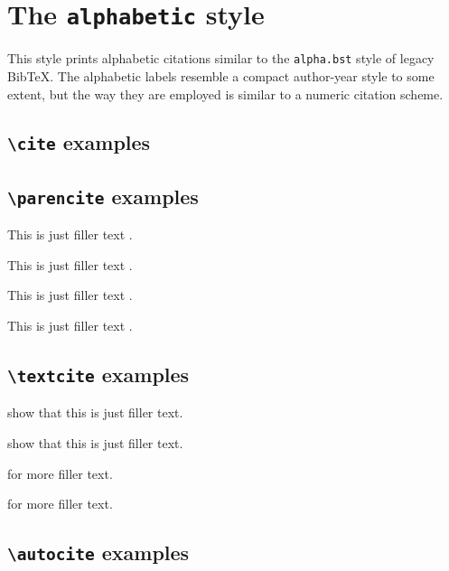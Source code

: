 \documentclass[a4paper]{article}
\newcommand{\cmd}[1]{\texttt{\textbackslash #1}}
\begin{document}
\section*{The \texttt{alphabetic} style}

This style prints alphabetic citations similar to the
\texttt{alpha.bst} style of legacy BibTeX. The alphabetic labels
resemble a compact author-year style to some extent, but the way
they are employed is similar to a numeric citation scheme.

\subsection*{\cmd{cite} examples}

\cite{companion}

\cite[59]{companion}

\cite[See][]{companion}

\cite[See][59--63]{companion}

\subsection*{\cmd{parencite} examples}


This is just filler text \parencite{companion}.

This is just filler text \parencite[59]{companion}.

This is just filler text \parencite[See][]{companion}.

This is just filler text \parencite[See][59--63]{companion}.

\subsection*{\cmd{textcite} examples}

\textcite{companion} show that this is just filler text.

\textcite[59]{companion} show that this is just filler text.

\textcite[See][]{companion} for more filler text.

\textcite[See][59--63]{companion} for more filler text.

\subsection*{\cmd{autocite} examples}
\end{document}
